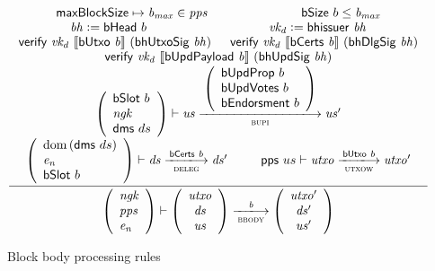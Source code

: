 \documentclass[11pt,a4paper]{article}
\DeclareMathOperator{\dom}{dom}
\newcommand{\var}[1]{\mathit{#1}}
\newcommand{\fun}[1]{\mathsf{#1}}
\newcommand{\trans}[2]{\xlongrightarrow[\textsc{#1}]{#2}}
\newcommand{\serialised}[1]{\llbracket \var{#1} \rrbracket}
\newcommand{\leteq}{\ensuremath{\mathrel{\mathop:}=}}
\newcommand{\bsizename}{bSize}
\newcommand{\verifyname}{verify}
\newcommand{\bcertsname}{bCerts}
\newcommand{\bhissuername}{bhissuer}
\newcommand{\verify}[3]{\fun{\verifyname} ~ #1 ~ #2 ~ #3}
\newcommand{\bsize}[1]{\fun{\bsizename} ~ #1}
\newcommand{\bcerts}[1]{\fun{\bcertsname} ~ #1}
\newcommand{\bhissuer}[1]{\fun{\bhissuername} ~ #1}
\begin{document}
\begin{figure}[ht]
  \begin{equation*}
    \inference
    { \maxblocksize \mapsto \var{b_{max}} \in \var{pps} && \bsize{b} \leq \var{b_{max}} \\
      \var{bh} \leteq \bhead{b} & \var{vk_d} \leteq \bhissuer{\var{bh}} \\
      \verify{\var{vk_d}}{\serialised{\butxo{b}}}{(\fun{bhUtxoSig}~\var{bh})} &
      \verify{\var{vk_d}}{\serialised{\bcerts{b}}}{(\fun{bhDlgSig}~\var{bh})} \\
      \verify{\var{vk_d}}{\serialised{\bupdpayload{b}}}{(\fun{bhUpdSig}~\var{bh})} \\
      {\left(
          \begin{array}{l}
            \bslot{b} \\
            \var{ngk}\\
            \fun{dms}~ ds
          \end{array}
        \right)}
      \vdash \var{us} \trans{bupi}{
        {\left(
            \begin{array}{l}
              \bupdprop{b} \\
              \bupdvotes{b} \\
              \bendorsment{b}
            \end{array}
          \right)}
      } \var{us'}
      \\
      {\left(
          \begin{array}{l}
            \dom{(\fun{dms}~ ds)} \\
            \var{e_n}\\
            \bslot{b}
          \end{array}
        \right)}
      \vdash \var{ds} \trans{deleg}{\bcerts{b}} \var{ds'} &
      \fun{pps} ~  us \vdash \var{utxo} \trans{utxow}{\butxo{b}} \var{utxo'} \\
    }
    {
      \left(
        {\begin{array}{l}
           \var{ngk}\\
           \var{pps} \\
           \var{e_n}
         \end{array}}
     \right)
     \vdash
     {
       \left(
         {\begin{array}{c}
            \var{utxo} \\
            \var{ds} \\
            \var{us}
          \end{array}}
      \right)
    }
    \trans{bbody}{\var{b}}
    {
      \left(
        {\begin{array}{c}
           \var{utxo'} \\
           \var{ds'} \\
           \var{us'}
         \end{array}}
     \right)
   }
 }
\end{equation*}
\caption{Block body processing rules}
\label{fig:rules:bbody}
\end{figure}
\end{document}
